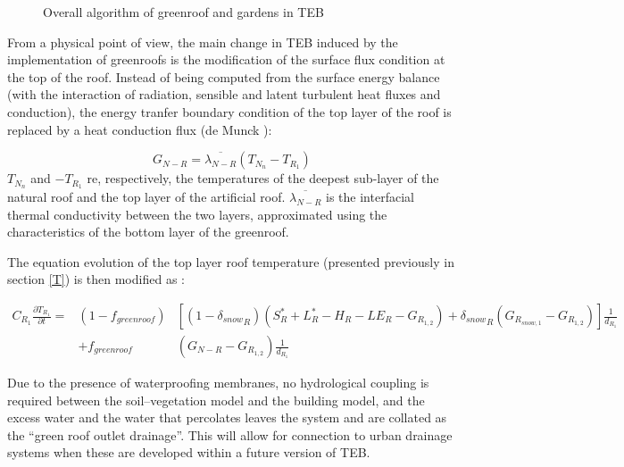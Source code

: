 \begin{figure}[t]
\hspace*{0.cm}
\caption{Overall algorithm of greenroof and gardens in TEB}
\label{garden}
\end{figure}

From a physical point of view, the main change in TEB induced by the implementation of greenroofs is the modification of the surface flux condition at the top of the roof. Instead of being computed from the surface energy balance (with the interaction of radiation, sensible and latent turbulent heat fluxes and conduction), the energy tranfer boundary condition of the top layer of the roof is replaced by a heat conduction flux (de Munck \nocite{demunck2013}):

\begin{equation}
G_{N-R} = \overline{\lambda_{N-R}} (T_{N_n}-T_{R_1})
\end{equation}
$T_{N_n}$ and $-T_{R_1}$ re, respectively, the temperatures of the deepest
sub-layer of the natural roof and the top layer of the artificial
roof. $\overline{\lambda_{N-R}}$ is the interfacial thermal conductivity between
the two layers, approximated using the characteristics of the bottom layer of the greenroof.

The equation evolution of the top layer roof temperature (presented previously in section \ref{T}) is then modified as :

\begin{eqnarray}
C_{R_1}\frac{\partial T_{R_1} }{\partial t} = & (1-f_{greenroof}) &\left[ (1-{\delta_{snow}}_R) \left( S_{R}^* + L_{R}^* - H_R -LE_R  - G_{R_{1,2}} \right) + {\delta_{snow}}_R\left( G_{R_{snow,1}} - G_{R_{1,2}} \right)\right] \frac{1}{d_{R_1}} \nonumber\\
 & + f_{greenroof} & (G_{N-R}  - G_{R_{1,2}} )\frac{1}{d_{R_1}} \nonumber 
\end{eqnarray}

Due to the presence of waterproofing membranes, no hydrological coupling is required between the soil–vegetation
model and the building model, and the excess water and the water that percolates leaves the system and are collated as the
“green roof outlet drainage”. This will allow for connection to urban drainage systems when these are developed within a future version of TEB. \\


